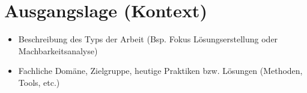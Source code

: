 \section{Ausgangslage (Kontext)}

\begin{itemize}	
	\item Beschreibung des Typs der Arbeit (Bsp. Fokus Lösungserstellung oder Machbarkeitsanalyse)
	\item Fachliche Domäne, Zielgruppe, heutige Praktiken bzw. Lösungen (Methoden, Tools, etc.)
\end{itemize}


